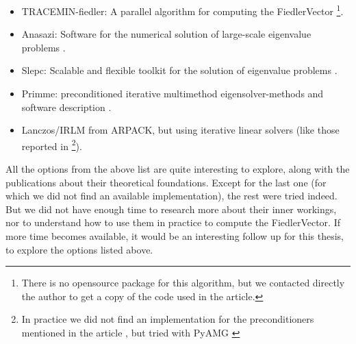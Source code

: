 \begin{itemize}
  \item TRACEMIN-fiedler: A parallel algorithm for computing the
    \gls{FiedlerVector} \cite{trminfiedler} \footnote{There is no
      opensource package for this algorithm, but we contacted directly
    the author to get a copy of the code used in the article.}.
  \item Anasazi: Software for the numerical solution of large-scale
    eigenvalue problems \cite{anasazi}.
  \item Slepc: Scalable and flexible toolkit for the solution of
    eigenvalue problems \cite{slepc}.
  \item Primme: preconditioned iterative multimethod
    eigensolver-methods and software description \cite{primme}.
  \item Lanczos/\gls{IRLM} from ARPACK, but using iterative linear solvers
    (like those reported in \cite{martinez16} \footnote{In practice we
  did not find an implementation for the preconditioners mentioned in
  the article \cite{martinez16}, but tried with PyAMG \cite{pyamg}}). 
\end{itemize}

All the options from the above list are quite interesting to explore, 
along with the publications about their theoretical
foundations. Except for the last one (for which we did not find an
available implementation), the rest were tried indeed. But we did
not have enough time to research more about their inner workings, nor
to understand how to use them in practice to compute the
\gls{FiedlerVector}. If more time becomes available, it would be an interesting
follow up for this thesis, to explore the options listed above.

